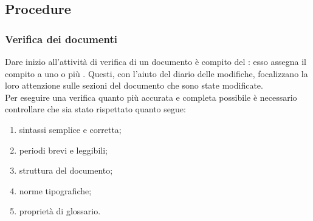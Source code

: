 	\subsection{Procedure}
		\subsubsection{Verifica dei documenti}
			Dare inizio all'attività di verifica di un documento è compito del : esso assegna il compito a uno o più . 
			Questi, con l'aiuto del diario delle modifiche, focalizzano la loro attenzione sulle sezioni del documento che sono state modificate.\\
			Per eseguire una verifica quanto più accurata e completa possibile è necessario controllare che sia stato rispettato quanto segue:
			\begin{enumerate}
				\item sintassi semplice e corretta;
				\item periodi brevi e leggibili;
				\item struttura del documento;
				\item norme tipografiche;
				\item proprietà di glossario.
			\end{enumerate}
